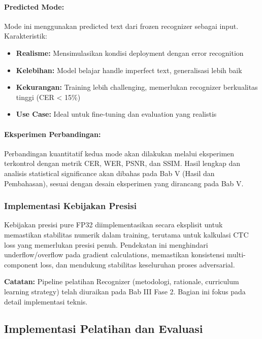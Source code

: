 \documentclass[12pt,a4paper]{article}
\begin{document}
\paragraph{Predicted Mode:}
Mode ini menggunakan predicted text dari frozen recognizer sebagai input. Karakteristik:
\begin{itemize}[leftmargin=*, nosep]
\item \textbf{Realisme:} Mensimulasikan kondisi deployment dengan error recognition
\item \textbf{Kelebihan:} Model belajar handle imperfect text, generalisasi lebih baik
\item \textbf{Kekurangan:} Training lebih challenging, memerlukan recognizer berkualitas tinggi (CER < 15\%)
\item \textbf{Use Case:} Ideal untuk fine-tuning dan evaluation yang realistis
\end{itemize}

\paragraph{Eksperimen Perbandingan:}
Perbandingan kuantitatif kedua mode akan dilakukan melalui eksperimen terkontrol dengan metrik CER, WER, PSNR, dan SSIM. Hasil lengkap dan analisis statistical significance akan dibahas pada Bab V (Hasil dan Pembahasan), sesuai dengan desain eksperimen yang dirancang pada Bab V.



\subsubsection{Implementasi Kebijakan Presisi}
\label{subsubsec:precision-policy-implementation}

Kebijakan presisi pure FP32 diimplementasikan secara eksplisit untuk memastikan stabilitas numerik dalam training, terutama untuk kalkulasi CTC loss yang memerlukan presisi penuh. Pendekatan ini menghindari underflow/overflow pada gradient calculations, memastikan konsistensi multi-component loss, dan mendukung stabilitas keseluruhan proses adversarial.

\textbf{Catatan:} Pipeline pelatihan Recognizer (metodologi, rationale, curriculum learning strategy) telah diuraikan pada Bab III Fase 2. Bagian ini fokus pada detail implementasi teknis.

\subsection{Implementasi Pelatihan dan Evaluasi}
\label{subsec:implementasi-training}
\end{document}
